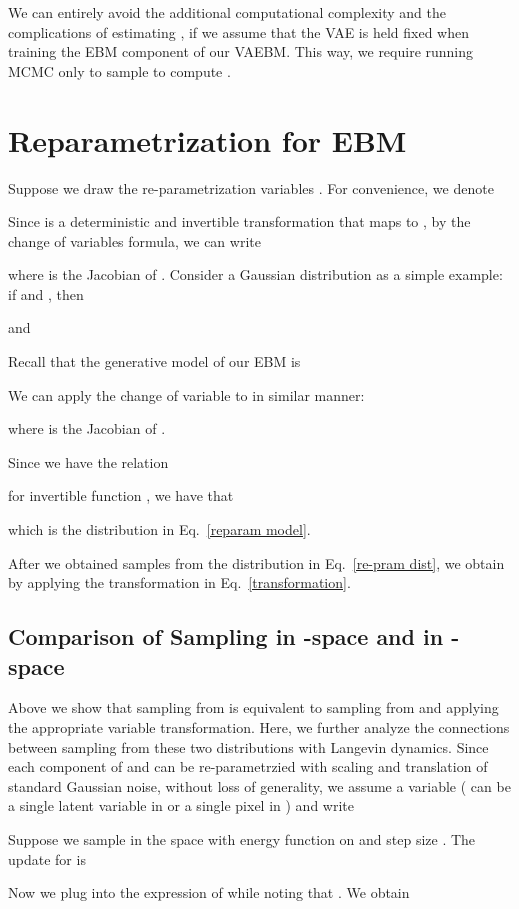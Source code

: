 \documentclass{article} \usepackage{iclr2021_conference,times}
\begin{document}
We can entirely avoid the additional computational complexity and the complications of estimating , if we assume that the VAE is held fixed when training the EBM component of our VAEBM. This way, we require running MCMC only to sample  to compute .

\section{Reparametrization for EBM}\label{appendix reparam}

Suppose we draw the re-parametrization variables . For convenience, we denote 


Since  is a deterministic and invertible transformation that maps  to , by the change of variables formula, we can write 

where  is the Jacobian of . Consider a Gaussian distribution as a simple example: if  and , then 

and 


Recall that the generative model of our EBM is

We can apply the change of variable to  in similar manner:

where  is the Jacobian of . 

Since we have the relation

for invertible function , we have that

which is the distribution in Eq.~\ref{reparam model}. 

After we obtained samples  from the distribution in Eq.~\ref{re-pram dist}, we obtain  by applying the transformation  in Eq.~\ref{transformation}.

\subsection{Comparison of Sampling in -space and in -space}
Above we show that sampling from  is equivalent to sampling from  and applying the appropriate variable transformation. Here, we further analyze the connections between sampling from these two distributions with Langevin dynamics. Since each component of  and  can be re-parametrzied with scaling and translation of standard Gaussian noise, without loss of generality, we assume a variable  ( can be a single latent variable in  or a single pixel in ) and write 

Suppose we sample in the  space with energy function  on  and step size . The update for  is 

Now we plug  into the expression of  while noting that . We obtain
\end{document}
